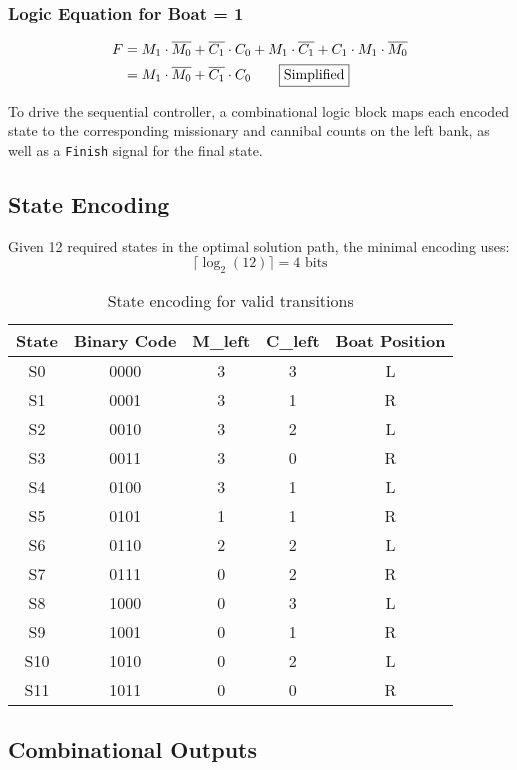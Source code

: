 \documentclass[10pt,a4paper]{article}
\begin{document}
\subsubsection*{Logic Equation for Boat = 1}

\begin{align*}
F &= M_1 \cdot \overline{M_0} + \overline{C_1} \cdot C_0 + M_1 \cdot \overline{C_1} + C_1 \cdot M_1 \cdot \overline{M_0} \\
  &= M_1 \cdot \overline{M_0} + \overline{C_1} \cdot C_0 \tag*{\fbox{Simplified}}
\end{align*}

\noindent To drive the sequential controller, a combinational logic block maps each encoded state to the corresponding missionary and cannibal counts on the left bank, as well as a \texttt{Finish} signal for the final state.

\subsection*{State Encoding}
Given 12 required states in the optimal solution path, the minimal encoding uses:
\[
\lceil \log_2(12) \rceil = 4 \text{ bits}
\]

\begin{table}[h!]
\centering
\footnotesize
\begin{tabular}{|c|c|c|c|c|}
\hline
\textbf{State} & \textbf{Binary Code} & \textbf{M\_left} & \textbf{C\_left} & \textbf{Boat Position} \\
\hline
S0  & 0000 & 3 & 3 & L \\
S1  & 0001 & 3 & 1 & R \\
S2  & 0010 & 3 & 2 & L \\
S3  & 0011 & 3 & 0 & R \\
S4  & 0100 & 3 & 1 & L \\
S5  & 0101 & 1 & 1 & R \\
S6  & 0110 & 2 & 2 & L \\
S7  & 0111 & 0 & 2 & R \\
S8  & 1000 & 0 & 3 & L \\
S9  & 1001 & 0 & 1 & R \\
S10 & 1010 & 0 & 2 & L \\
S11 & 1011 & 0 & 0 & R \\
\hline
\end{tabular}
\caption{State encoding for valid transitions}
\end{table}

\subsection*{Combinational Outputs}
\end{document}

